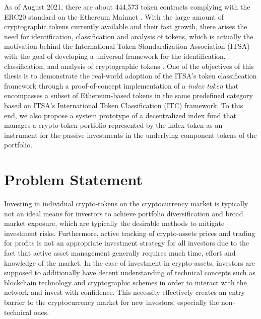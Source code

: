 As of August 2021, there are about 444,573 token contracts complying with the ERC20 standard on the Ethereum Mainnet \cite{etherscantokentracker}. With the large amount of cryptographic tokens currently available and their fast growth, there arises the need for identification, classification and analysis of tokens, which is actually the motivation behind the International Token Standardization Association (ITSA) with the goal of developing a universal framework for the identification, classification, and analysis of cryptographic tokens \cite{itsadefinition}. One of the objectives of this thesis is to demonstrate the real-world adoption of the ITSA's token classification framework through a proof-of-concept implementation of a \textit{index token} that encompasses a subset of Ethereum-based tokens in the same predefined category based on ITSA's International Token Classification (ITC) framework. To this end, we also propose a system prototype of a decentralized index fund that manages a crypto-token portfolio represented by the index token as an instrument for the passive investments in the underlying component tokens of the portfolio.

\section{Problem Statement}

    Investing in individual crypto-tokens on the cryptocurrency market is typically not an ideal means for investors to achieve portfolio diversification and broad market exposure, which are typically the desirable methods to mitigate investment risks. Furthermore, active tracking of crypto-assets prices and trading for profits is not an appropriate investment strategy for all investors due to the fact that active asset management generally requires much time, effort and knowledge of the market. In the case of investment in crypto-assets, investors are supposed to additionally have decent understanding of technical concepts such as blockchain technology and cryptographic schemes in order to interact with the network and invest with confidence. This necessity effectively creates an entry barrier to the cryptocurrency market for new investors, especially the non-technical ones. 

